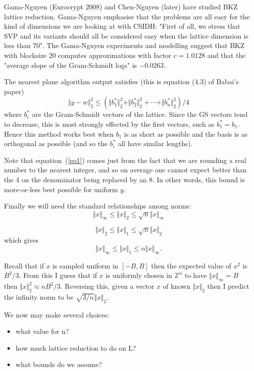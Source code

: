 \documentclass{llncs}
\newcommand{\Z}{\mathbb{Z}}
\begin{document}
Gama-Nguyen (Eurocrypt 2008) and Chen-Nguyen (later) have studied BKZ lattice reduction.
Gama-Nguyen emphasise that the problems are all easy for the kind of dimensions we are looking at with CSIDH: "First of all, we stress that SVP and its variants should all be considered easy when the lattice dimension is less than 70".
The Gama-Nguyen experiments and modelling suggest that BKZ with blocksize 20 computes approximations with factor $c = 1.0128$ and that the "average slope of the Gram-Schmidt logs" is $-0.0263$.

The nearest plane algorithm output satisfies (this is equation (4.3) of Babai's paper)
\begin{equation} \label{eq1}
    \Vert y - w \Vert_2^2 \le (\Vert b_1^*\Vert_2^2 + \Vert b_2^*\Vert_2^2 + \cdots + \Vert b_n^*\Vert_2^2 )/4
\end{equation}
where $b_i^*$ are the Gram-Schmidt vectors of the lattice. Since the GS vectors tend to decrease, this is most strongly effected by the first vectors, such as $b_1^* = b_1$. Hence this method works best when $b_1$ is as short as possible and the basis is as orthogonal as possible (and so the $b_i^*$ all have similar lengths).

Note that equation~(\ref{eq1}) comes just from the fact that we are rounding a real number to the nearest integer, and so on average one cannot expect better than the 4 on the denominator being replaced by an 8. In other words, this bound is more-or-less best possible for uniform $y$.

Finally we will need the standard relationships among norms: 
\[   \Vert x \Vert_\infty  \le  \Vert x \Vert_2   \le  \sqrt{n} \Vert x \Vert_\infty\]

\[   \Vert x \Vert_2   \le  \Vert x \Vert_1   \le   \sqrt{n} \Vert x \Vert_2 \]
which gives
\[   \Vert x \Vert_\infty  \le  \Vert x \Vert_1   \le   n \Vert x \Vert_\infty . \]

Recall that if $x$ is sampled uniform in $[-B,B]$ then the expected value of $x^2$ is $B^2/3$.
From this I guess that if $x$ is uniformly chosen in $\Z^n$ to have $\Vert x \Vert_\infty = B$ then $\Vert x \Vert_2^2 \approx n B^2/3$.
Reversing this, given a vector $x$ of known $\Vert x \Vert_2$ then I predict the infinity norm to be $\sqrt{3/n} \Vert x \Vert_2$.


We now may make several choices:
\begin{itemize}
\item what value for n?
\item how much lattice reduction to do on L?
\item what bounds do we assume?
\end{itemize}
\end{document}
